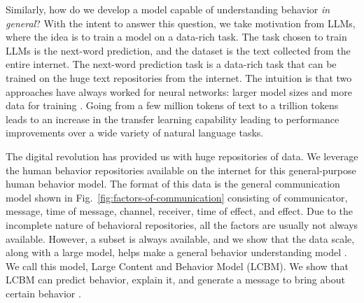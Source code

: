 Similarly, how do we develop a model capable of understanding behavior \textit{in general}? With the intent to answer this question, we take motivation from LLMs, where the idea is to train a model on a data-rich task. The task chosen to train LLMs is the next-word prediction, and the dataset is the text collected from the entire internet. The next-word prediction task is a data-rich task that can be trained on the huge text repositories from the internet. The intuition is that two approaches have always worked for neural networks: larger model sizes and more data for training \cite{mikolov2013efficient,devlin2018bert,radford2018improving,raffel2020exploring}. Going from a few million tokens of text \cite{mikolov2013efficient,radford2018improving} to a trillion tokens \cite{touvron2023llama,brown2020language} leads to an increase in the transfer learning capability leading to performance improvements over a wide variety of natural language tasks. 


The digital revolution has provided us with huge repositories of data. We leverage the human behavior repositories available on the internet for this general-purpose human behavior model. The format of this data is the general communication model shown in Fig.~\ref{fig:factors-of-communication} consisting of communicator, message, time of message, channel, receiver, time of effect, and effect. Due to the incomplete nature of behavioral repositories, all the factors are usually not always available. However, a subset is always available, and we show that the data scale, along with a large model, helps make a general behavior understanding model \cite{khandelwal2023large}. We call this model, Large Content and Behavior Model (LCBM). We show that LCBM can predict behavior, explain it, and generate a message to bring about certain behavior \cite{si2023long,khandelwal2023large,khurana2023behavior}. 



